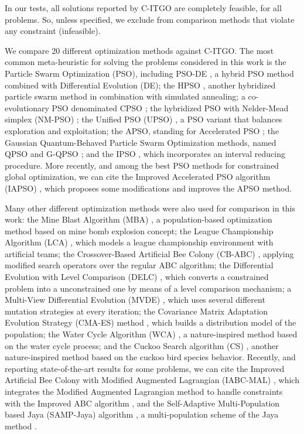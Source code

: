 


In our tests, all solutions reported by C-ITGO are completely feasible, for all problems. So, unless specified, we exclude from comparison methods that violate any constraint (infeasible).

We compare 20 different optimization methods against C-ITGO. The most common meta-heuristic for solving the problems considered in this work is the Particle Swarm Optimization (PSO), including PSO-DE \citep{PSO-DE}, a hybrid PSO method combined with Differential Evolution (DE); the HPSO \citep{HPSO}, another hybridized particle swarm method in combination with simulated annealing; a co-evolutionary PSO denominated CPSO \citep{CPSO}; the hybridized PSO with Nelder-Mead simplex (NM-PSO) \citep{NM-PSO}; the Unified PSO (UPSO) \citep{UPSO}, a PSO variant that balances exploration and exploitation; the APSO, standing for Accelerated PSO  \citep{APSO}; the Gaussian Quantum-Behaved Particle Swarm Optimization methods, named QPSO and G-QPSO \citep{QPSO}; and the IPSO \citep{IPSO}, which incorporates an interval reducing procedure. More recently, and among the best PSO methods for constrained global optimization, we can cite the Improved Accelerated PSO algorithm (IAPSO) \citep{IAPSO}, which proposes some modifications and improves the APSO method.

Many other different optimization methods were also used for comparison in this work: the Mine Blast Algorithm (MBA) \citep{MBA}, a population-based optimization method based on mine bomb explosion concept; the League Championship Algorithm (LCA) \citep{LCA}, which models a league championship environment with artificial teams; the Crossover-Based Artificial Bee Colony (CB-ABC) \citep{CB-ABC}, applying modified search operators over the regular ABC algorithm; the Differential Evolution with Level Comparison (DELC) \citep{DELC}, which converts a constrained problem into a unconstrained one by means of a level comparison mechanism; a Multi-View Differential Evolution (MVDE) \citep{MVDE}, which uses several different mutation strategies at every iteration; the Covariance Matrix Adaptation Evolution Strategy (CMA-ES) method \citep{CMA-ES}, which builds a distribution model of the population; the Water Cycle Algorithm (WCA) \citep{WCA}, a nature-inspired method based on the water cycle process; and the Cuckoo Search algorithm (CS) \citep{CS}, another nature-inspired method based on the cuckoo bird species behavior. Recently, and reporting state-of-the-art results for some problems, we can cite the Improved Artificial Bee Colony with Modified Augmented Lagrangian (IABC-MAL) \citep{IABC-Mal}, which integrates the Modified Augmented Lagrangian method to handle constraints with the Improved ABC algorithm \citep{IABC}, and the Self-Adaptive Multi-Population based Jaya (SAMP-Jaya) algorithm \citep{SAMP-Jaya}, a multi-population scheme of the Jaya method \citep{Jaya}.


